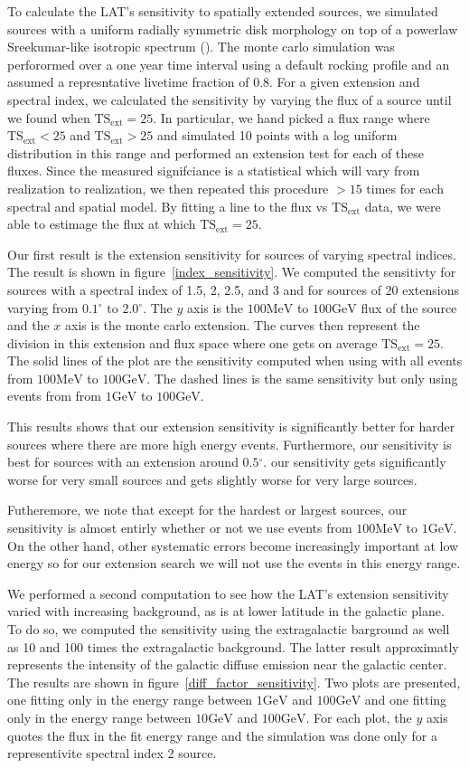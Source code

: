 \documentclass[preprint]{aastex}
\newcommand{\mev}{\text{MeV}\xspace}
\newcommand{\gev}{\text{GeV}\xspace}
\newcommand{\tsext}{{\ensuremath{\text{TS}_\text{ext}}}\xspace}
\renewcommand{\deg}{\ensuremath{^\circ}\xspace}
\begin{document}
To calculate the LAT's sensitivity to spatially extended sources,
we simulated sources with a uniform radially symmetric
disk morphology on top of a powerlaw Sreekumar-like isotropic
spectrum (\cite{sreekumar_isotropic}).  The monte carlo
simulation was perforormed over a one year time interval using a default
rocking profile and an assumed a represntative livetime fraction of 0.8.
For a given extension and spectral index, we calculated the
sensitivity by varying the flux of a source until we found 
when $\tsext=25$. In particular, we hand picked a flux range
where $\tsext<25$ and $\tsext>25$ and simulated 10 points with
a log uniform distribution in this range and performed an extension
test for each of these fluxes. Since the measured signifciance is
a statistical which will vary from realization to realization,
we then repeated this procedure $>15$ times for each spectral
and spatial model.
By fitting a line to the flux vs $\tsext$ data, we were able to
estimage the flux at which $\tsext=25$.

Our first result is the extension sensitivity for sources of varying
spectral indices. The result is shown in figure~\ref{index_sensitivity}.
We computed the sensitivty for sources with a spectral index of 1.5,
2, 2.5, and 3 and for sources of 20 extensions varying from $0.1\deg$
to $2.0\deg$. The $y$ axis is the $100\mev$ to $100\gev$ flux of the
source and the $x$ axis is the monte carlo extension. The curves then
represent the division in this extension and flux space where one gets
on average $\tsext=25$.
The solid lines of the plot are the sensitivity computed when using
with all events from $100\mev$ to $100\gev$. The dashed lines is the
same sensitivity but only using events from from $1\gev$ to $100\gev$.

This results shows that our extension sensitivity is
significantly better for harder sources where there are more high
energy events. Furthermore, our sensitivity is best for sources with an
extension around $0.5\deg$.  our sensitivity gets significantly worse
for very small sources and gets slightly worse for very large sources.

Futheremore, we note that except for the hardest or largest sources,
our sensitivity is almost entirly whether or not we use events from
$100\mev$ to $1\gev$. On the other hand, other systematic errors become
increasingly important at low energy so for our extension search we will
not use the events in this energy range.

We performed a second computation to see how the LAT's extension
sensitivity varied with increasing background, as is at lower latitude
in the galactic plane. To do so, we computed the sensitivity using the
extragalactic barground as well as 10 and 100 times the extragalactic
background. The latter result approximatly represents the intensity of
the galactic diffuse emission near the galactic center. The results are
shown in figure~\ref{diff_factor_sensitivity}. Two plots are presented,
one fitting only in the energy range between $1\gev$ and $100\gev$ and
one fitting only in the energy range between $10\gev$ and $100\gev$. For
each plot, the $y$ axis quotes the flux in the fit energy range and the
simulation was done only for a representivite spectral index 2 source.
\end{document}
